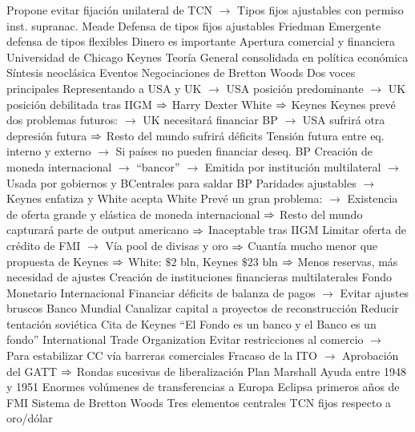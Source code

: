 \documentclass{nuevotema}
\begin{document}
\begin{esquemal}
				\4[] Propone evitar fijación unilateral de TCN
				\4[] $\to$ Tipos fijos ajustables con permiso inst. supranac.
				\4 Meade
				\4[] Defensa de tipos fijos ajustables
				\4 Friedman
				\4[] Emergente defensa de tipos flexibles
				\4[] Dinero es importante
				\4[] Apertura comercial y financiera
				\4[] Universidad de Chicago
				\4 Keynes
				\4[] Teoría General consolidada en política económica
				\4[] Síntesis neoclásica
		\2 Eventos
			\3 Negociaciones de Bretton Woods
				\4 Dos voces principales
				\4[] Representando a USA y UK
				\4[] $\to$ USA posición predominante
				\4[] $\to$ UK posición debilitada tras IIGM
				\4[] $\Rightarrow$ Harry Dexter White
				\4[] $\Rightarrow$ Keynes
				\4 Keynes prevé dos problemas futuros:
				\4[] $\to$ UK necesitará financiar BP
				\4[] $\to$ USA sufrirá otra depresión futura
				\4[] $\Rightarrow$ Resto del mundo sufrirá déficits
				\4[] Tensión futura entre eq. interno y externo
				\4[] $\to$ Si países no pueden financiar deseq. BP
				\4[] Creación de moneda internacional
				\4[] $\to$ ``bancor''
				\4[] $\to$ Emitida por institución multilateral
				\4[] $\to$ Usada por gobiernos y BCentrales para saldar BP
				\4[] Paridades ajustables
				\4[] $\to$ Keynes enfatiza y White acepta
				\4 White
				\4[] Prevé un gran problema:
				\4[] $\to$ Existencia de oferta grande y elástica de moneda internacional
				\4[] $\Rightarrow$ Resto del mundo capturará parte de output americano
				\4[] $\Rightarrow$ Inaceptable tras IIGM
				\4[] Limitar oferta de crédito de FMI
				\4[] $\to$ Vía pool de divisas y oro
				\4[] $\Rightarrow$ Cuantía mucho menor que propuesta de Keynes
				\4[] $\Rightarrow$ White: $\$2$ bln, Keynes $\$23$ bln
				\4[] $\Rightarrow$ Menos reservas, más necesidad de ajustes
			\3 Creación de instituciones financieras multilaterales
				\4 Fondo Monetario Internacional
				\4[] Financiar déficits de balanza de pagos
				\4[] $\to$ Evitar ajustes bruscos
				\4 Banco Mundial
				\4[] Canalizar capital a proyectos de reconstrucción
				\4[] Reducir tentación soviética
				\4 Cita de Keynes
				\4[] ``El Fondo es un banco y el Banco es un fondo''
				\4 International Trade Organization
				\4[] Evitar restricciones al comercio
				\4[] $\to$ Para estabilizar CC vía barreras comerciales
				\4[] Fracaso de la ITO
				\4[] $\to$ Aprobación del GATT
				\4[] $\Rightarrow$ Rondas sucesivas de liberalización
			\3 Plan Marshall
				\4 Ayuda entre 1948 y 1951
				\4 Enormes volúmenes de transferencias a Europa
				\4 Eclipsa primeros años de FMI
			\3 Sistema de Bretton Woods
				\4 Tres elementos centrales
				\4[I] TCN fijos respecto a oro/dólar

\end{esquemal}
\end{document}
